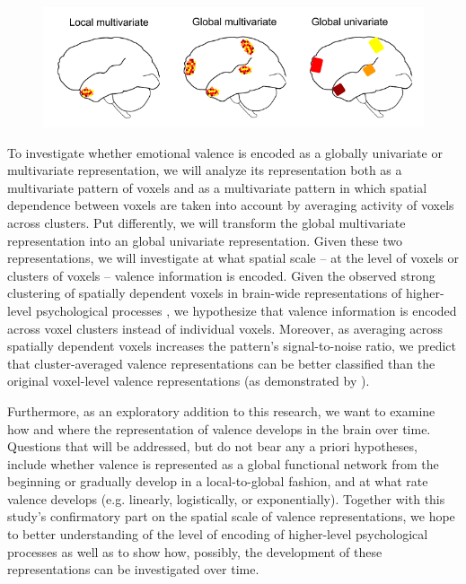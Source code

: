 \documentclass[12pt,a4paper]{article}\usepackage[]{graphicx}\usepackage[]{color}
\begin{document}
\begin{figure}[h]
\centering
\includegraphics[scale=.55]{spatialDist}
\end{figure}

To investigate whether emotional valence is encoded as a globally univariate or multivariate representation, we will analyze its representation both as a multivariate pattern of voxels and as a multivariate pattern in which spatial dependence between voxels are taken into account by averaging activity of voxels across clusters. Put differently, we will transform the global multivariate representation into an global univariate representation. Given these two representations, we will investigate at what spatial scale -- at the level of voxels or clusters of voxels -- valence information is encoded.  Given the observed strong clustering of spatially dependent voxels in brain-wide representations of higher-level psychological processes \cite{kassam2013,oosterwijk2015,baucom2012}, we hypothesize that valence information is encoded across voxel clusters instead of individual voxels. Moreover, as averaging across spatially dependent voxels increases the pattern's signal-to-noise ratio, we predict that cluster-averaged valence representations can be better classified than the original voxel-level valence representations (as demonstrated by \citealp{brants2011}).  

Furthermore, as an exploratory addition to this research, we want to examine how and where the representation of valence develops in the brain over time. Questions that will be addressed, but do not bear any a priori hypotheses, include whether valence is represented as a global functional network from the beginning or gradually develop in a local-to-global fashion, and at what rate valence develops (e.g. linearly, logistically, or exponentially). Together with this study's confirmatory part on the spatial scale of valence representations, we hope to better understanding of the level of encoding of higher-level psychological processes as well as to show how, possibly, the development of these representations can be investigated over time.
\end{document}
